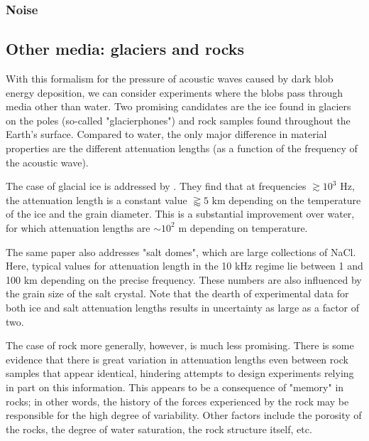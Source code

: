 \documentclass[%
 reprint,
 amsmath,amssymb,
 aps,nofootinbib
]{revtex4-1}
\begin{document}
\subsubsection{Noise}



\subsection{Other media: glaciers and rocks}

With this formalism for the pressure of acoustic waves caused by dark blob energy deposition, we can consider experiments where the blobs pass through media other than water. Two promising candidates are the ice found in glaciers on the poles (so-called "glacierphones") and rock samples found throughout the Earth's surface. Compared to water, the only major difference in material properties are the different attenuation lengths (as a function of the frequency of the acoustic wave).

The case of glacial ice is addressed by \citep{Price:2006}. They find that at frequencies $\gtrsim 10^3 \text{ Hz}$, the attenuation length is a constant value $\gtrapprox 5 \text{ km}$ depending on the temperature of the ice and the grain diameter. This is a substantial improvement over water, for which attenuation lengths are $\sim 10^2 \text{ m}$ depending on temperature.

The same paper also addresses "salt domes", which are large collections of NaCl. Here, typical values for attenuation length in the 10 kHz regime lie between 1 and 100 km depending on the precise frequency. These numbers are also influenced by the grain size of the salt crystal. Note that the dearth of experimental data for both ice and salt attenuation lengths results in uncertainty as large as a factor of two.

The case of rock more generally, however, is much less promising. There is some evidence \citep{Buckingham:1997} that there is great variation in attenuation lengths even between rock samples that appear identical, hindering attempts to design experiments relying in part on this information. This appears to be a consequence of "memory" in rocks; in other words, the history of the forces experienced by the rock may be responsible for the high degree of variability. Other factors include the porosity of the rocks, the degree of water saturation, the rock structure itself, etc.
\end{document}
